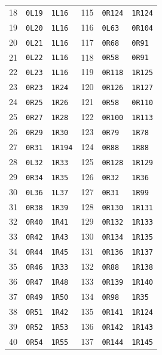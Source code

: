 \begin{longtable}{@{}rll@{\hspace{2em}}rll@{}}
18 & \texttt{0L19} & \texttt{1L16} & 115 & \texttt{0R124} & \texttt{1R124}\\
19 & \texttt{0L20} & \texttt{1L16} & 116 & \texttt{0L63} & \texttt{0R104}\\
20 & \texttt{0L21} & \texttt{1L16} & 117 & \texttt{0R68} & \texttt{0R91}\\
21 & \texttt{0L22} & \texttt{1L16} & 118 & \texttt{0R58} & \texttt{0R91}\\
22 & \texttt{0L23} & \texttt{1L16} & 119 & \texttt{0R118} & \texttt{1R125}\\
23 & \texttt{0R23} & \texttt{1R24} & 120 & \texttt{0R126} & \texttt{1R127}\\
24 & \texttt{0R25} & \texttt{1R26} & 121 & \texttt{0R58} & \texttt{0R110}\\
25 & \texttt{0R27} & \texttt{1R28} & 122 & \texttt{0R100} & \texttt{1R113}\\
26 & \texttt{0R29} & \texttt{1R30} & 123 & \texttt{0R79} & \texttt{1R78}\\
27 & \texttt{0R31} & \texttt{1R194} & 124 & \texttt{0R88} & \texttt{1R88}\\
28 & \texttt{0L32} & \texttt{1R33} & 125 & \texttt{0R128} & \texttt{1R129}\\
29 & \texttt{0R34} & \texttt{1R35} & 126 & \texttt{0R32} & \texttt{1R36}\\
30 & \texttt{0L36} & \texttt{1L37} & 127 & \texttt{0R31} & \texttt{1R99}\\
31 & \texttt{0R38} & \texttt{1R39} & 128 & \texttt{0R130} & \texttt{1R131}\\
32 & \texttt{0R40} & \texttt{1R41} & 129 & \texttt{0R132} & \texttt{1R133}\\
33 & \texttt{0R42} & \texttt{1R43} & 130 & \texttt{0R134} & \texttt{1R135}\\
34 & \texttt{0R44} & \texttt{1R45} & 131 & \texttt{0R136} & \texttt{1R137}\\
35 & \texttt{0R46} & \texttt{1R33} & 132 & \texttt{0R88} & \texttt{1R138}\\
36 & \texttt{0R47} & \texttt{1R48} & 133 & \texttt{0R139} & \texttt{1R140}\\
37 & \texttt{0R49} & \texttt{1R50} & 134 & \texttt{0R98} & \texttt{1R35}\\
38 & \texttt{0R51} & \texttt{1R42} & 135 & \texttt{0R141} & \texttt{1R124}\\
39 & \texttt{0R52} & \texttt{1R53} & 136 & \texttt{0R142} & \texttt{1R143}\\
40 & \texttt{0R54} & \texttt{1R55} & 137 & \texttt{0R144} & \texttt{1R145}\\

\end{longtable}
